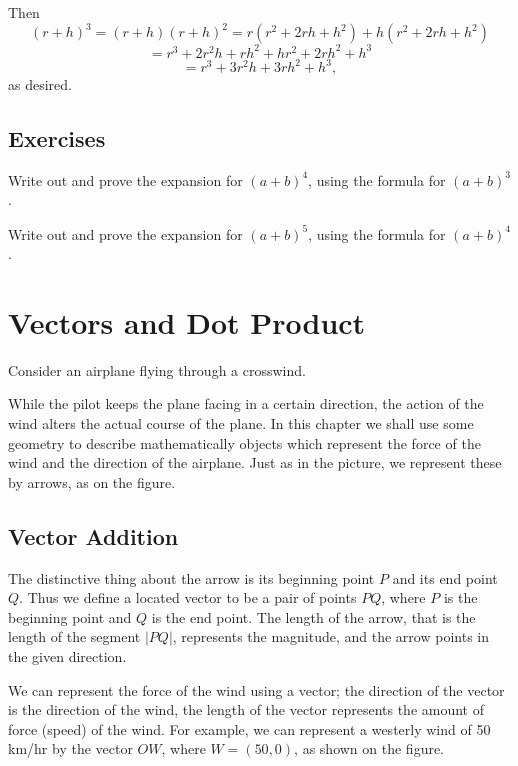 \documentclass[12pt]{book} %
\begin{document}
Then
\[
(r+h)^3=(r+h)(r+h)^2=r(r^2+2rh+h^2)+h(r^2+2rh+h^2)
\]
\[
=r^3+2r^2h+rh^2+hr^2+2rh^2+h^3
\]
\[
=r^3+3r^2h+3rh^2+h^3,
\]
as desired.

\section*{Exercises}

\setcounter{Exercise}{0}
\begin{ExerciseList}
\Exercise Write out and prove the expansion for $(a+b)^4$, using the formula for $(a+b)^3$.

\Exercise Write out and prove the expansion for $(a+b)^5$, using the formula for $(a+b)^4$.
\end{ExerciseList}

\chapter{Vectors and Dot Product}

Consider an airplane flying through a crosswind.


While the pilot keeps the plane facing in a certain direction, the action of the wind alters the actual course of the plane. In this chapter we shall use some geometry to describe mathematically objects which represent the force of the wind and the direction of the airplane. Just as in the picture, we represent these by arrows, as on the figure.


\section{Vector Addition}

The distinctive thing about the arrow is its beginning point $P$ and its end point $Q$. Thus we define a located vector to be a pair of points $PQ$, where $P$ is the beginning point and $Q$ is the end point. The length of the arrow, that is the length of the segment $|PQ|$, represents the magnitude, and the arrow points in the given direction.

We can represent the force of the wind using a vector; the direction of the vector is the direction of the wind, the length of the vector represents the amount of force (speed) of the wind. For example, we can represent a westerly wind of 50 km/hr by the vector $OW$, where $W=(50,0)$, as shown on the figure.
\end{document}
